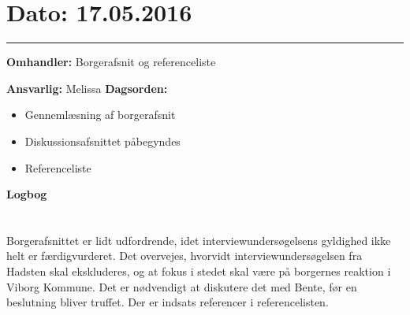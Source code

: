 \section{Dato: 17.05.2016}
\hrule

\textbf{Omhandler:} Borgerafsnit og referenceliste

\textbf{Ansvarlig:} Melissa
\textbf{Dagsorden:}
\begin{itemize}
	\item Gennemlæsning af borgerafsnit
	\item Diskussionsafsnittet påbegyndes 
	\item Referenceliste
	
\end{itemize}

\textbf{Logbog}
\\
\\ \\
Borgerafsnittet er lidt udfordrende, idet interviewundersøgelsens gyldighed ikke helt er færdigvurderet. Det overvejes, hvorvidt interviewundersøgelsen fra Hadsten skal ekskluderes, og at fokus i stedet skal være på borgernes reaktion i Viborg Kommune. 
Det er nødvendigt at diskutere det med Bente, før en beslutning bliver truffet.
Der er indsats referencer i referencelisten.